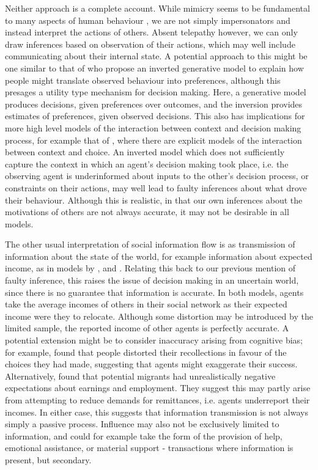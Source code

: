 \documentclass{article}
\begin{document}
Neither approach is a complete account. While mimicry seems to be fundamental to many aspects of human behaviour \citep{Chartrand1999}, we are not simply impersonators and instead interpret the actions of others. Absent telepathy however, we can only draw inferences based on observation of their actions, which may well include communicating about their internal state. A potential approach to this might be one similar to that of \citet{Jern2011a} who propose an inverted generative model to explain how people might translate observed behaviour into preferences, although this presages a utility type mechanism for decision making. Here, a generative model produces decisions, given preferences over outcomes, and the inversion provides estimates of preferences, given observed decisions. This also has implications for more high level models of the interaction between context and decision making process, for example that of \citet{Ben-Akiva2012}, where there are explicit models of the interaction between context and choice. An inverted model which does not sufficiently capture the context in which an agent's decision making took place, i.e. the observing agent is underinformed about inputs to the other's decision process, or constraints on their actions, may well lead to faulty inferences about what drove their behaviour. Although this is realistic, in that our own inferences about the motivations of others are not always accurate, it may not be desirable in all models.

The other usual interpretation of social information flow is as transmission of information about the state of the world, for example information about expected income, as in models by \citet{Filho2011}, and \citet{Klabunde2014}.  Relating this back to our previous mention of faulty inference, this raises the issue of decision making in an uncertain world, since there is no guarantee that information is accurate. In both models, agents take the average incomes of others in their social network as their expected income were they to relocate. Although some distortion may be introduced by the limited sample, the reported income of other agents is perfectly accurate. 
A potential extension might be to consider inaccuracy arising from cognitive bias; for example, \citet{Mather2000} found that people distorted their recollections in favour of the choices they had made, suggesting that agents might exaggerate their success. Alternatively, \citet{McKenzie2013} found that potential migrants had unrealistically negative expectations about earnings and employment. They suggest this may partly arise from attempting to reduce demands for remittances, i.e. agents underreport their incomes. In either case, this suggests that information transmission is not always simply a passive process. Influence may also not be exclusively limited to information, and could for example take the form of the provision of help, emotional assistance, or material support - transactions where information is present, but secondary.
\end{document}

